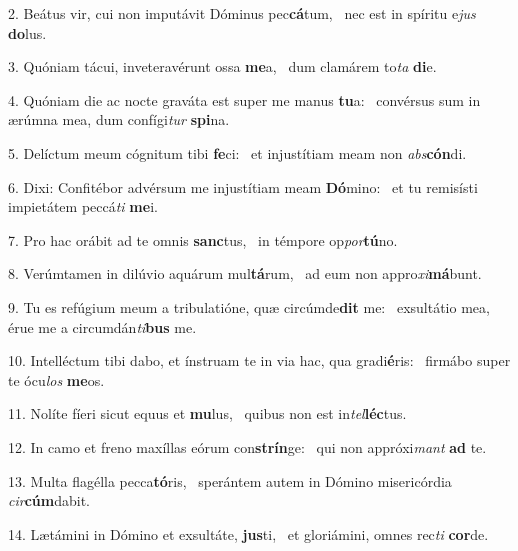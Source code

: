 2. Beátus vir, cui non imputávit Dóminus pec\textbf{cá}tum, \ast\  nec est in spíritu e\textit{jus} \textbf{do}lus.\

3. Quóniam tácui, inveteravérunt ossa \textbf{me}a, \ast\  dum clamárem to\textit{ta} \textbf{di}e.\

4. Quóniam die ac nocte graváta est super me manus \textbf{tu}a: \ast\  convérsus sum in ærúmna mea, dum confígi\textit{tur} \textbf{spi}na.\

5. Delíctum meum cógnitum tibi \textbf{fe}ci: \ast\  et injustítiam meam non \textit{abs}\textbf{cón}di.\

6. Dixi: Confitébor advérsum me injustítiam meam \textbf{Dó}mino: \ast\  et tu remisísti impietátem peccá\textit{ti} \textbf{me}i.\

7. Pro hac orábit ad te omnis \textbf{sanc}tus, \ast\  in témpore op\textit{por}\textbf{tú}no.\

8. Verúmtamen in dilúvio aquárum mul\textbf{tá}rum, \ast\  ad eum non appro\textit{xi}\textbf{má}bunt.\

9. Tu es refúgium meum a tribulatióne, quæ circúmde\textbf{dit} me: \ast\  exsultátio mea, érue me a circumdán\textit{ti}\textbf{bus} me.\

10. Intelléctum tibi dabo, et ínstruam te in via hac, qua gradi\textbf{é}ris: \ast\  firmábo super te ócu\textit{los} \textbf{me}os.\

11. Nolíte fíeri sicut equus et \textbf{mu}lus, \ast\  quibus non est in\textit{tel}\textbf{léc}tus.\

12. In camo et freno maxíllas eórum con\textbf{strín}ge: \ast\  qui non appróxi\textit{mant} \textbf{ad} te.\

13. Multa flagélla pecca\textbf{tó}ris, \ast\  sperántem autem in Dómino misericórdia \textit{cir}\textbf{cúm}dabit.\

14. Lætámini in Dómino et exsultáte, \textbf{jus}ti, \ast\  et gloriámini, omnes rec\textit{ti} \textbf{cor}de.\


